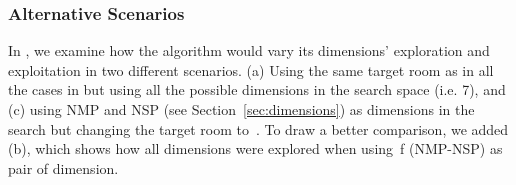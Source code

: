 

\subsubsection{Alternative Scenarios}

In , we examine how the algorithm would vary its dimensions' exploration and exploitation in two different scenarios. (a) Using the same target room as in all the cases in  but using all the possible dimensions in the search space (i.e. 7), and (c) using NMP and NSP (see Section~\ref{sec:dimensions}) as dimensions in the search but changing the target room to~. To draw a better comparison, we added (b), which shows how all dimensions were explored when using~f (NMP-NSP) as pair of dimension.



